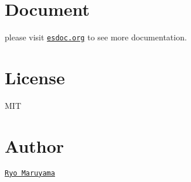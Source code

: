 \section*{Document}

please visit \href{https://esdoc.org}{\tt esdoc.\+org} to see more documentation.

\section*{License}

M\+IT

\section*{Author}

\href{https://twitter.com/h13i32maru}{\tt Ryo Maruyama} 